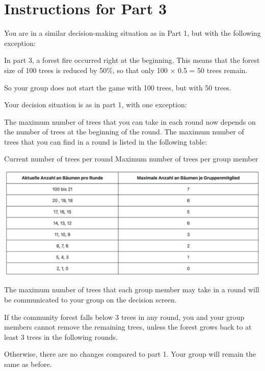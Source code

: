 \setlength{\parskip}{1em}
\section*{Instructions for Part 3}

You are in a similar decision-making situation as in Part 1, but with the following exception:

\noindent In part 3, a forest fire occurred right at the beginning. This means that the forest size of 100 trees is reduced by 50\%, so that only 100 × 0.5 = 50 trees remain.

\noindent So your group does not start the game with 100 trees, but with 50 trees.

\noindent Your decision situation is as in part 1, with one exception:

\noindent The maximum number of trees that you can take in each round now depends on the number of trees at the beginning of the round. The maximum number of trees that you can find in a round is listed in the following table:

\noindent Current number of trees per round	 Maximum number of trees per group member

\includegraphics[width=16cm]{../bld/graphs/A. Harvest table.jpg}

\noindent The maximum number of trees that each group member may take in a round will be communicated to your group on the decision screen.

\noindent If the community forest falls below 3 trees in any round, you and your group members cannot remove the remaining trees, unless the forest grows back to at least 3 trees in the following rounds.

\noindent Otherwise, there are no changes compared to part 1. Your group will remain the same as before.
